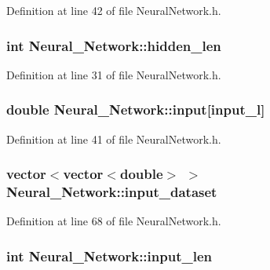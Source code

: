 Definition at line 42 of file Neural\-Network.\-h.

\hypertarget{a00003_a71cc8ca03da47fe639dd1e8ed518069c}{
\subsubsection[{hidden\-\_\-len}]{\setlength{\rightskip}{0pt plus 5cm}int Neural\-\_\-\-Network\-::hidden\-\_\-len\hspace{0.3cm}{\ttfamily [private]}}}\label{d1/d7c/a00003_a71cc8ca03da47fe639dd1e8ed518069c}


Definition at line 31 of file Neural\-Network.\-h.

\hypertarget{a00003_a347a1fceb1ac048ecd913a89126cebb3}{
\subsubsection[{input}]{\setlength{\rightskip}{0pt plus 5cm}double Neural\-\_\-\-Network\-::input\mbox{[}{\bf input\-\_\-l}\mbox{]}\hspace{0.3cm}{\ttfamily [private]}}}\label{d1/d7c/a00003_a347a1fceb1ac048ecd913a89126cebb3}


Definition at line 41 of file Neural\-Network.\-h.

\hypertarget{a00003_a81bab51b36643c5b10ba25d518c27ff3}{
\subsubsection[{input\-\_\-dataset}]{\setlength{\rightskip}{0pt plus 5cm}vector$<$vector$<$double$>$ $>$ Neural\-\_\-\-Network\-::input\-\_\-dataset\hspace{0.3cm}{\ttfamily [private]}}}\label{d1/d7c/a00003_a81bab51b36643c5b10ba25d518c27ff3}


Definition at line 68 of file Neural\-Network.\-h.

\hypertarget{a00003_a9e5319bf385fa55bbbd8f0160915306d}{
\subsubsection[{input\-\_\-len}]{\setlength{\rightskip}{0pt plus 5cm}int Neural\-\_\-\-Network\-::input\-\_\-len\hspace{0.3cm}{\ttfamily [private]}}}\label{d1/d7c/a00003_a9e5319bf385fa55bbbd8f0160915306d}


